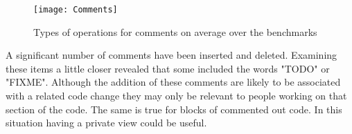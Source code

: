 \begin{figure}[!t]
 \begin{center}
 \texttt{[image: Comments]}
 \end{center}
 \caption{Types of operations for comments on average over the benchmarks}
 \label{fig:commentsPie}
\end{figure}

A significant number of comments have been inserted and deleted.
Examining these items a little closer revealed that some included the words "TODO" or "FIXME".
Although the addition of these comments are likely to be associated with a related code change they may only be relevant to people working on that section of the code.
The same is true for blocks of commented out code.
In this situation having a private view could be useful.  


  



% 
% 

